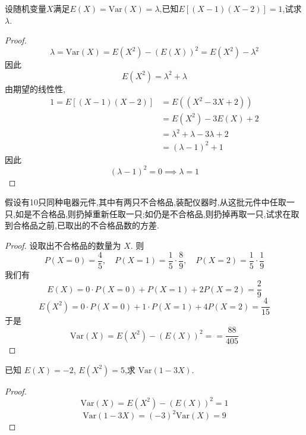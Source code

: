 \documentclass[../main.tex]{subfiles}
\begin{document}
 \begin{exercise}{}{}
设随机变量$X$满足$E(X) = \text{Var}(X)=\lambda$,已知$E[(X-1) (X-2)] = 1$,试求$\lambda$.
\end{exercise}
\begin{proof}
     \[
     \lambda =  \mathrm{Var}\left( X \right)= E\left( X^{2} \right)-\left( E\left( X \right)  \right)^{2}= E\left( X^{2} \right)- \lambda ^{2}    
     \]因此 \[
     E\left( X^{2} \right)=  \lambda ^{2}+  \lambda  
     \]由期望的线性性,  \[
   \begin{aligned}
     1= E\left[ \left( X-1 \right)\left( X-2 \right)   \right] &= E\left( \left( X^{2}-3X+ 2 \right)  \right)\\ 
      &= E\left( X^{2} \right)-3E\left( X \right)+ 2\\ 
       &=  \lambda ^{2}+  \lambda -3 \lambda + 2\\ 
        &=     \left(  \lambda -1 \right)^{2}+ 1 
   \end{aligned}
     \]因此 \[
     \left(  \lambda -1 \right)^{2}= 0\implies  \lambda = 1 
     \]
\end{proof}
\begin{exercise}{}{}
假设有10只同种电器元件,其中有两只不合格品,装配仪器时,从这批元件中任取一只,如是不合格品,则扔掉重新任取一只;如仍是不合格品,则扔掉再取一只,试求在取到合格品之前,已取出的不合格品数的方差.
\end{exercise}
\begin{proof}
    设取出不合格品的数量为 \(  X  \). 则 \[
    P\left( X= 0\right)=  \frac{4 }{5 },\quad P\left( X= 1 \right)= \frac{1 }{5 }\cdot \frac{8 }{9 },\quad P\left( X= 2 \right)= \frac{1 }{5 }\cdot \frac{1 }{9 }       
    \] 我们有 \[
    E\left( X \right)= 0\cdot P\left( X= 0 \right)+  P\left( X= 1 \right)+ 2P\left( X= 2 \right)   = \frac{2 }{9 } 
    \] \[
    E\left( X^{2} \right)= 0\cdot P\left( X= 0 \right)+ 1\cdot P\left( X= 1 \right)+ 4P\left( X= 2 \right)= \frac{4 }{15 }     
    \]于是 \[
    \mathrm{Var}\left( X \right)= E\left( X^{2} \right)- \left( E\left( X \right)  \right)^{2}=   = \frac{88 }{405 } 
    \]
\end{proof}
\begin{exercise}{}{}
已知 $E(X)=-2$, $E(X^2) = 5$,求 $\text{Var}(1-3X)$.
\end{exercise}
\begin{proof}
    \[
    \mathrm{Var}\left( X \right)= E\left( X^{2} \right)-\left( E\left( X \right)  \right)^{2}= 1   
    \] \[
    \mathrm{Var}\left( 1-3X \right)= \left( -3 \right)^{2}\mathrm{Var}\left( X \right)= 9   
    \]
\end{proof}
\end{document}
